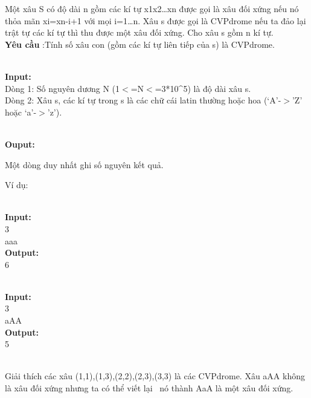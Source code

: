 



   Một xâu S có độ dài n gồm các kí tự x1x2…xn được gọi là xâu đối xứng nếu nó thỏa mãn xi=xn-i+1 với mọi i=1…n. Xâu s được gọi là CVPdrome nếu ta đảo lại trật tự các kí tự thì thu được một xâu đối xứng. Cho xâu s gồm n kí tự.   
\\\textbf{    Yêu cầu   }   :Tính số xâu con (gồm các kí tự liên tiếp của s) là CVPdrome.  


\\\textbf{    Input:   }
\\   Dòng 1: Số nguyên dương N (1$<$=N$<$=3*10\textasciicircum5) là độ dài xâu s.   
\\   Dòng 2: Xâu s, các kí tự trong s là các chữ cái latin thường hoặc hoa (‘A’-$>$’Z’ hoặc ‘a’-$>$’z’).  


\\\textbf{    Ouput:   }

   Một dòng duy nhất ghi số nguyên kết quả.  

   Ví dụ:  


\\\textbf{    Input:   }
\\   3   
\\   aaa   
\\\textbf{    Output:   }
\\   6  


\\\textbf{    Input:   }
\\   3   
\\   aAA   
\\\textbf{    Output:   }
\\   5  


\\   Giải thích các xâu (1,1),(1,3),(2,2),(2,3),(3,3) là các CVPdrome. Xâu aAA không là xâu đối xứng nhưng ta có thể viết lại  nó thành AaA là một xâu đối xứng.  
